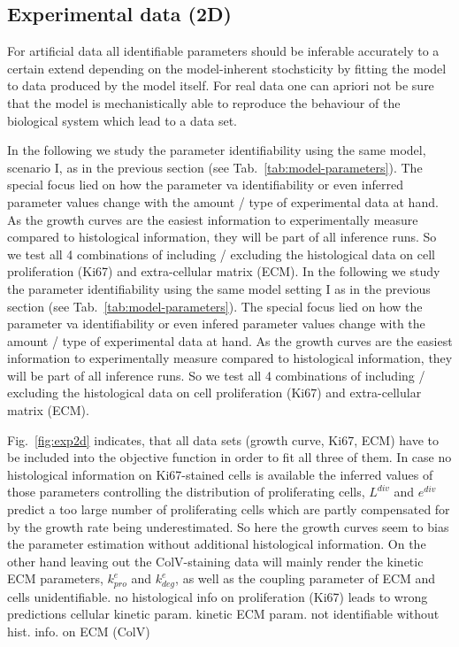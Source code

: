\documentclass[10pt,letterpaper]{article}
\begin{document}
\subsection*{Experimental data (2D)} For artificial data all identifiable parameters should be inferable accurately to a certain extend depending on the model-inherent stochsticity by fitting the model to data produced by the model itself. For real data one can apriori not be sure that the model is mechanistically able to reproduce the behaviour of the biological system which lead to a data set. 

In the following we study the parameter identifiability using the same model, scenario I, as in the previous section (see Tab.~\ref{tab:model-parameters}). The special focus lied on how the parameter va identifiability or even inferred parameter values change with the amount / type of experimental data at hand. As the growth curves are the easiest information to experimentally measure compared to histological information, they will be part of all inference runs. So we test all 4 combinations of including / excluding the histological data on cell proliferation (Ki67) and extra-cellular matrix (ECM).
In the following we study the parameter identifiability using the same model setting I as in the previous section (see Tab.~\ref{tab:model-parameters}). The special focus lied on how the parameter va identifiability or even infered parameter values change with the amount / type of experimental data at hand. As the growth curves are the easiest information to experimentally measure compared to histological information, they will be part of all inference runs. So we test all 4 combinations of including / excluding the histological data on cell proliferation (Ki67) and extra-cellular matrix (ECM).


Fig.~\ref{fig:exp2d} indicates, that all data sets (growth curve, Ki67, ECM) have to be included into the objective function in order to fit all three of them. In case no histological information on Ki67-stained cells is available the inferred values of those parameters controlling the distribution of proliferating cells, $L^{div}$ and $e^{div}$ predict a too large number of proliferating cells which are partly compensated for by the growth rate being underestimated. So here the growth curves seem to bias the parameter estimation without additional histological information.
On the other hand leaving out the ColV-staining data will mainly render the kinetic ECM parameters, $k^{e}_{pro}$ and $k^{e}_{deg}$, as well as the coupling parameter of ECM and cells unidentifiable. 
no histological info on proliferation (Ki67) leads to wrong predictions cellular kinetic param.
kinetic ECM param. not identifiable without hist. info. on ECM (ColV)
\end{document}
